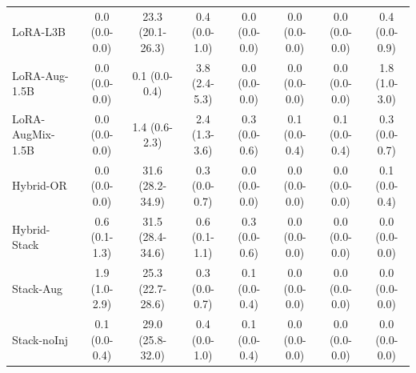 \begin{table}[t]
\begin{tabular}{lccccccc}
LoRA-L3B & 0.0 (0.0-0.0) & 23.3 (20.1-26.3) & 0.4 (0.0-1.0) & 0.0 (0.0-0.0) & 0.0 (0.0-0.0) & 0.0 (0.0-0.0) & 0.4 (0.0-0.9) \\
LoRA-Aug-1.5B & 0.0 (0.0-0.0) & 0.1 (0.0-0.4) & 3.8 (2.4-5.3) & 0.0 (0.0-0.0) & 0.0 (0.0-0.0) & 0.0 (0.0-0.0) & 1.8 (1.0-3.0) \\
LoRA-AugMix-1.5B & 0.0 (0.0-0.0) & 1.4 (0.6-2.3) & 2.4 (1.3-3.6) & 0.3 (0.0-0.6) & 0.1 (0.0-0.4) & 0.1 (0.0-0.4) & 0.3 (0.0-0.7) \\
Hybrid-OR & 0.0 (0.0-0.0) & 31.6 (28.2-34.9) & 0.3 (0.0-0.7) & 0.0 (0.0-0.0) & 0.0 (0.0-0.0) & 0.0 (0.0-0.0) & 0.1 (0.0-0.4) \\
Hybrid-Stack & 0.6 (0.1-1.3) & 31.5 (28.4-34.6) & 0.6 (0.1-1.1) & 0.3 (0.0-0.6) & 0.0 (0.0-0.0) & 0.0 (0.0-0.0) & 0.0 (0.0-0.0) \\
Stack-Aug & 1.9 (1.0-2.9) & 25.3 (22.7-28.6) & 0.3 (0.0-0.7) & 0.1 (0.0-0.4) & 0.0 (0.0-0.0) & 0.0 (0.0-0.0) & 0.0 (0.0-0.0) \\
Stack-noInj & 0.1 (0.0-0.4) & 29.0 (25.8-32.0) & 0.4 (0.0-1.0) & 0.1 (0.0-0.4) & 0.0 (0.0-0.0) & 0.0 (0.0-0.0) & 0.0 (0.0-0.0) \\
\bottomrule
\end{tabular}
\end{table}